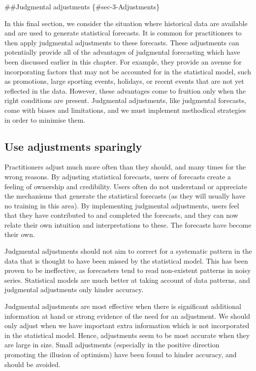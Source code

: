 \documentclass[]{book}
\begin{document}
\#\#Judgmental adjustments \{\#sec-3-Adjustments\}

In this final section, we consider the situation where historical data are available and are used to generate statistical forecasts. It is common for practitioners to then apply judgmental adjustments to these forecasts. These adjustments can potentially provide all of the advantages of judgmental forecasting which have been discussed earlier in this chapter. For example, they provide an avenue for incorporating factors that may not be accounted for in the statistical model, such as promotions, large sporting events, holidays, or recent events that are not yet reflected in the data. However, these advantages come to fruition only when the right conditions are present. Judgmental adjustments, like judgmental forecasts, come with biases and limitations, and we must implement methodical strategies in order to minimise them.

\hypertarget{use-adjustments-sparingly}{%
\subsection*{Use adjustments sparingly}\label{use-adjustments-sparingly}}

Practitioners adjust much more often than they should, and many times for the wrong reasons. By adjusting statistical forecasts, users of forecasts create a feeling of ownership and credibility. Users often do not understand or appreciate the mechanisms that generate the statistical forecasts (as they will usually have no training in this area). By implementing judgmental adjustments, users feel that they have contributed to and completed the forecasts, and they can now relate their own intuition and interpretations to these. The forecasts have become their own.

Judgmental adjustments should not aim to correct for a systematic pattern in the data that is thought to have been missed by the statistical model. This has been proven to be ineffective, as forecasters tend to read non-existent patterns in noisy series. Statistical models are much better at taking account of data patterns, and judgmental adjustments only hinder accuracy.

Judgmental adjustments are most effective when there is significant additional information at hand or strong evidence of the need for an adjustment. We should only adjust when we have important extra information which is not incorporated in the statistical model. Hence, adjustments seem to be most accurate when they are large in size. Small adjustments (especially in the positive direction promoting the illusion of optimism) have been found to hinder accuracy, and should be avoided.
\end{document}
